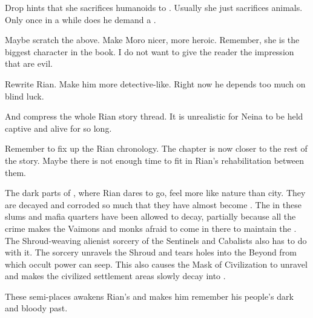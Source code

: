 \begin{changes}
    Drop hints that she sacrifices humanoids to \Nasshikerr.
    Usually she just sacrifices animals. 
    Only once in a while does he demand a \humanoid.
    
    Maybe scratch the above. 
    Make Moro nicer, more heroic.
    Remember, she is the biggest \scatha character in the book.
    I do not want to give the reader the impression that \scathae are evil. 

  \begin{comment}\paragraph{Rian}\end{comment}
    Rewrite Rian.
    Make him more detective-like.
    Right now he depends too much on blind luck. 
    
    And compress the whole Rian story thread. 
    It is unrealistic for Neina to be held captive and alive for so long. 
    
    Remember to fix up the Rian chronology. 
    The  chapter is now closer to the rest of the story. 
    Maybe there is not enough time to fit in Rian's rehabilitation between them. 
    
    The dark parts of \Malcur, where Rian dares to go, feel more like nature than city.
    They are decayed and corroded so much that they have almost become \wylde. 
    The \eidola in these slums and mafia quarters have been allowed to decay, partially because all the crime makes the Vaimons and monks afraid to come in there to maintain the \eidola.
    The Shroud-weaving alienist sorcery of the Sentinels and Cabalists also has to do with it. 
    The sorcery unravels the Shroud and tears holes into the Beyond from which occult power can seep. 
    This also causes the Mask of Civilization to unravel and makes the civilized settlement areas slowly decay into \wylde.
    
    These semi-\wylde places awakens Rian's  and makes him remember his people's dark and bloody past.
    


\end{changes}
